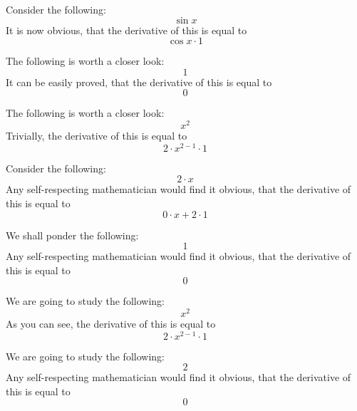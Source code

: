 \documentclass{article}
\begin{document}
Consider the following:
\begin{equation}
\sin x 
\end{equation}
It is now obvious, that the derivative of this is equal to
\begin{equation}
\cos x \cdot 1 
\end{equation}

The following is worth a closer look:
\begin{equation}
1 
\end{equation}
It can be easily proved, that the derivative of this is equal to
\begin{equation}
0 
\end{equation}

The following is worth a closer look:
\begin{equation}
x ^{2 } 
\end{equation}
Trivially, the derivative of this is equal to
\begin{equation}
2 \cdot x ^{2 - 1 } \cdot 1 
\end{equation}

Consider the following:
\begin{equation}
2 \cdot x 
\end{equation}
Any self-respecting mathematician would find it obvious, that the derivative of this is equal to
\begin{equation}
0 \cdot x + 2 \cdot 1 
\end{equation}

We shall ponder the following:
\begin{equation}
1 
\end{equation}
Any self-respecting mathematician would find it obvious, that the derivative of this is equal to
\begin{equation}
0 
\end{equation}

We are going to study the following:
\begin{equation}
x ^{2 } 
\end{equation}
As you can see, the derivative of this is equal to
\begin{equation}
2 \cdot x ^{2 - 1 } \cdot 1 
\end{equation}

We are going to study the following:
\begin{equation}
2 
\end{equation}
Any self-respecting mathematician would find it obvious, that the derivative of this is equal to
\begin{equation}
0 
\end{equation}
\end{document}
